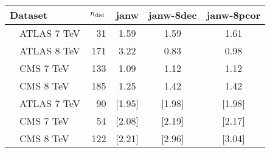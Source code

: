 \begin{tabularx}{\textwidth}{Xrccc}
    \toprule
     Dataset                    & $n_{\rm dat}$ & janw &    janw-8dec   &  janw-8pcor     \\
    \midrule
     \ \ ATLAS 7 TeV            &         31  & 1.59 &  1.59 &  1.61     \\
     \ \ ATLAS 8 TeV            &        171  & 3.22 &  0.83 &  0.98     \\
     \ \ CMS   7 TeV            &        133  & 1.09 &  1.12 &  1.12     \\
     \ \ CMS   8 TeV            &        185  & 1.25 &  1.42 &  1.42     \\
     \ \ ATLAS 7 TeV            &         90  & [1.95] & [1.98] & [1.98]    \\
     \ \ CMS   7 TeV            &         54  & [2.08] & [2.19] & [2.17]    \\
     \ \ CMS   8 TeV            &        122  & [2.21] & [2.96] & [3.04]    \\
    \bottomrule
\end{tabularx}
